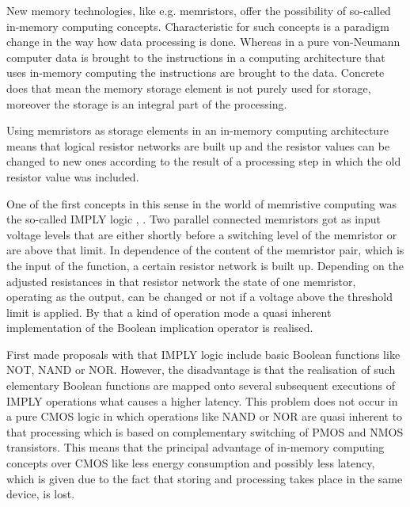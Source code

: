 \documentclass[pageno]{jpaper}
\begin{document}


New memory technologies, like e.g. memristors, offer the possibility of so-called in-memory computing concepts. Characteristic for such concepts is a paradigm change in the way how data processing is done. Whereas in a pure von-Neumann computer data is brought to the instructions in a computing architecture that uses in-memory computing the instructions are brought to the data. Concrete does that mean the memory storage element is not purely used for storage, moreover the storage is an integral part of the processing. 

Using memristors as storage elements in an in-memory computing architecture means that logical resistor networks are built up and the resistor values can be changed to new ones according to the result of a processing step in which the old resistor value was included.         

One of the first concepts in this sense in the world of memristive computing  was the so-called IMPLY logic \cite{Borghetti2010}, \cite{Kvatinsky2011}. Two parallel connected memristors got as input voltage levels that are either shortly before a switching level of the memristor or are above that limit. In dependence of the content of the memristor pair, which is the input of the function, a certain resistor network is built up. Depending on the adjusted resistances in that resistor network the state of one memristor, operating as the output, can be changed or not if a voltage above the threshold limit is applied. By that a kind of operation mode a quasi inherent implementation of the Boolean implication operator is realised.     

First made proposals with that IMPLY logic include basic Boolean functions like NOT, NAND or NOR. However, the disadvantage is that the realisation of such elementary Boolean functions are mapped onto several subsequent executions of IMPLY operations what causes a higher latency. This problem does not occur in a pure CMOS logic in which operations like NAND or NOR are quasi inherent to that processing which is based on complementary switching of PMOS and NMOS transistors. This means that the principal advantage of in-memory computing concepts over CMOS like less energy consumption and possibly less latency, which is given due to the fact that storing and processing takes place in the same device, is lost.    
\end{document}
